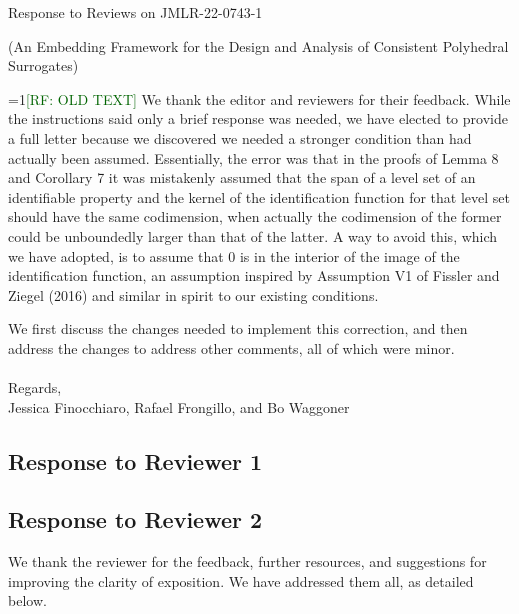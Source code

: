 \documentclass[a4paper]{article}
\newcommand{\Comments}{1}
\newcommand{\mynote}[2]{\ifnum\Comments=1\textcolor{#1}{#2}\fi}
\newcommand{\raf}[1]{\mynote{darkgreen}{[RF: #1]}}
\begin{document}
\begin{center}
  {\Large Response to Reviews on JMLR-22-0743-1}
  
  (An Embedding Framework for the Design and Analysis of Consistent Polyhedral Surrogates)
\end{center}

\raf{OLD TEXT}
  We thank the editor and reviewers for their feedback.  While the instructions said only a brief response was needed, we have elected to provide a full letter because we discovered we needed a stronger condition than had actually been assumed.  Essentially, the error was that in the proofs of Lemma 8 and Corollary 7 it was mistakenly assumed that the span of a level set of an identifiable property and the kernel of the identification function for that level set should have the same codimension, when actually the codimension of the former could be unboundedly larger than that of the latter.  A way to avoid this, which we have adopted, is to assume that 0 is in the interior of the image of the identification function, an assumption inspired by Assumption V1 of Fissler and Ziegel (2016) and similar in spirit to our existing conditions.

We first discuss the changes needed to implement this correction, and then address the changes to address other comments, all of which were minor.\\
\\
Regards,\\
Jessica Finocchiaro, Rafael Frongillo, and Bo Waggoner

\subsection*{Response to Reviewer 1}


\subsection*{Response to Reviewer 2}

We thank the reviewer for the feedback, further resources, and suggestions for improving the clarity of exposition.
We have addressed them all, as detailed below.
\end{document}
